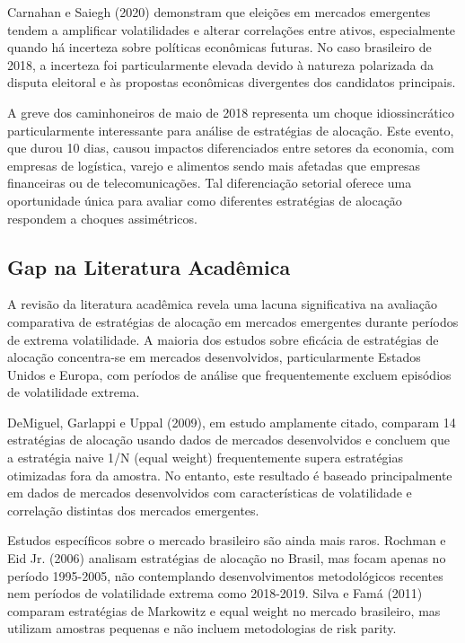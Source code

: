 Carnahan e Saiegh (2020) demonstram que eleições em mercados emergentes tendem a amplificar volatilidades e alterar correlações entre ativos, especialmente quando há incerteza sobre políticas econômicas futuras. No caso brasileiro de 2018, a incerteza foi particularmente elevada devido à natureza polarizada da disputa eleitoral e às propostas econômicas divergentes dos candidatos principais.

A greve dos caminhoneiros de maio de 2018 representa um choque idiossincrático particularmente interessante para análise de estratégias de alocação. Este evento, que durou 10 dias, causou impactos diferenciados entre setores da economia, com empresas de logística, varejo e alimentos sendo mais afetadas que empresas financeiras ou de telecomunicações. Tal diferenciação setorial oferece uma oportunidade única para avaliar como diferentes estratégias de alocação respondem a choques assimétricos.

\subsection{Gap na Literatura Acadêmica}

A revisão da literatura acadêmica revela uma lacuna significativa na avaliação comparativa de estratégias de alocação em mercados emergentes durante períodos de extrema volatilidade. A maioria dos estudos sobre eficácia de estratégias de alocação concentra-se em mercados desenvolvidos, particularmente Estados Unidos e Europa, com períodos de análise que frequentemente excluem episódios de volatilidade extrema.

DeMiguel, Garlappi e Uppal (2009), em estudo amplamente citado, comparam 14 estratégias de alocação usando dados de mercados desenvolvidos e concluem que a estratégia naive 1/N (equal weight) frequentemente supera estratégias otimizadas fora da amostra. No entanto, este resultado é baseado principalmente em dados de mercados desenvolvidos com características de volatilidade e correlação distintas dos mercados emergentes.

Estudos específicos sobre o mercado brasileiro são ainda mais raros. Rochman e Eid Jr. (2006) analisam estratégias de alocação no Brasil, mas focam apenas no período 1995-2005, não contemplando desenvolvimentos metodológicos recentes nem períodos de volatilidade extrema como 2018-2019. Silva e Famá (2011) comparam estratégias de Markowitz e equal weight no mercado brasileiro, mas utilizam amostras pequenas e não incluem metodologias de risk parity.

